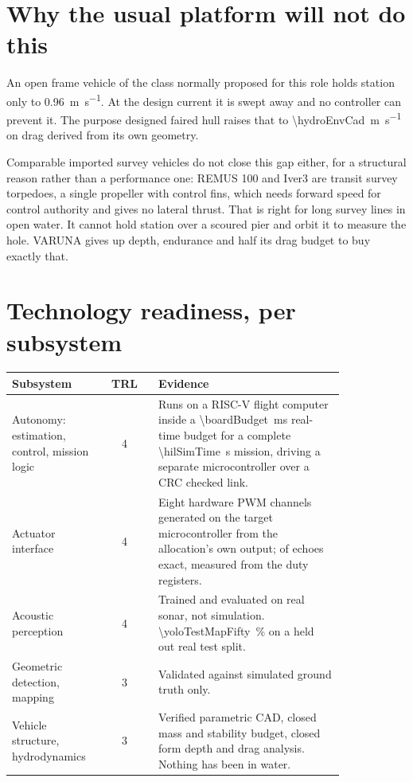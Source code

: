 \documentclass[10pt,a4paper]{article}
\begin{document}
\section*{Why the usual platform will not do this}

An open frame vehicle of the class normally proposed for this role holds
station only to \SI{0.96}{\metre\per\second}. At the design current it is
swept away and no controller can prevent it. The purpose designed faired hull
raises that to \SI{\hydroEnvCad}{\metre\per\second} on drag derived from its
own geometry.

Comparable imported survey vehicles do not close this gap either, for a
structural reason rather than a performance one: REMUS 100 and Iver3 are
transit survey torpedoes, a single propeller with control fins, which needs
forward speed for control authority and gives no lateral thrust. That is right
for long survey lines in open water. It cannot hold station over a scoured
pier and orbit it to measure the hole. VARUNA gives up depth, endurance and
half its drag budget to buy exactly that.

\section*{Technology readiness, per subsystem}

\begin{center}\small
\begin{tabular}{@{}p{0.27\linewidth}c p{0.56\linewidth}@{}}
\toprule
\textbf{Subsystem} & \textbf{TRL} & \textbf{Evidence} \\
\midrule
Autonomy: estimation, control, mission logic & 4 &
Runs on a RISC-V flight computer inside a
\SI{\boardBudget}{\milli\second} real-time budget for a complete
\SI{\hilSimTime}{\second} mission, driving a separate microcontroller over a
CRC checked link. \\
Actuator interface & 4 &
Eight hardware PWM channels generated on the target microcontroller from the
allocation's own output; \espMatched{} of \espEchoes{} echoes exact, measured
from the duty registers. \\
Acoustic perception & 4 &
Trained and evaluated on real sonar, not simulation.
\SI{\yoloTestMapFifty}{\percent} on a held out real test split. \\
Geometric detection, mapping & 3 &
Validated against simulated ground truth only. \\
Vehicle structure, hydrodynamics & 3 &
Verified parametric CAD, closed mass and stability budget, closed form depth
and drag analysis. Nothing has been in water. \\
\bottomrule
\end{tabular}
\end{center}
\end{document}
